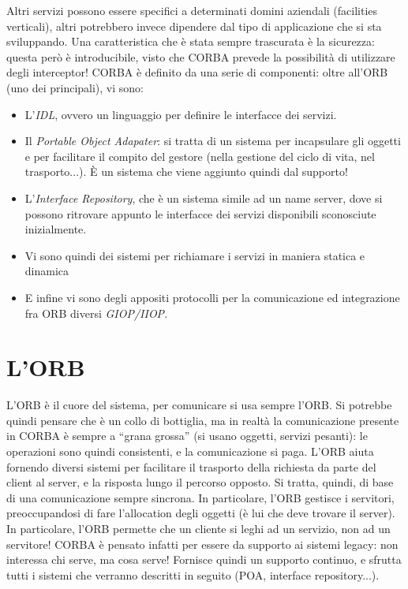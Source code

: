 Altri servizi possono essere specifici a determinati domini aziendali (facilities verticali), altri potrebbero invece dipendere dal tipo di
applicazione che si sta sviluppando.
Una caratteristica che è stata sempre trascurata è la sicurezza: questa però è introducibile, visto che CORBA prevede
la possibilità di utilizzare degli interceptor!
CORBA è definito da una serie di componenti: oltre all'ORB (uno dei principali), vi sono:
\begin{itemize}
 \item L'\textit{IDL}, ovvero un linguaggio per definire le interfacce dei servizi.
 \item Il \textit{Portable Object Adapater}: si tratta di un sistema per incapsulare gli oggetti e per facilitare il
compito del gestore (nella gestione del ciclo di vita, nel trasporto...). È un sistema che viene aggiunto quindi dal supporto!
 \item L'\textit{Interface Repository}, che è un sistema simile ad un name server, dove si possono ritrovare appunto le interfacce dei servizi disponibili sconosciute inizialmente.
 \item Vi sono quindi dei sistemi per richiamare i servizi in maniera statica e dinamica
 \item E infine vi sono degli appositi protocolli per la comunicazione ed integrazione fra ORB diversi \textit{GIOP/IIOP}.
\end{itemize}
\section{L'ORB}
L'ORB è il cuore del sistema, per comunicare si usa sempre l'ORB. Si potrebbe quindi pensare che è un collo di
bottiglia, ma in realtà la comunicazione presente in CORBA è sempre a ``grana grossa'' (si usano oggetti, servizi
pesanti): le operazioni sono quindi consistenti, e la comunicazione si paga. L'ORB aiuta fornendo diversi sistemi per
facilitare il trasporto della richiesta da parte del client al server, e la risposta lungo il percorso opposto. Si
tratta, quindi, di base di una comunicazione sempre sincrona.
In particolare, l'ORB gestisce i servitori, preoccupandosi di fare l'allocation degli oggetti (è lui che deve trovare il
server). In particolare, l'ORB permette che un cliente si leghi ad un servizio, non ad un servitore! CORBA è pensato
infatti per essere da supporto ai sistemi legacy: non interessa chi serve, ma cosa serve! Fornisce quindi un supporto
continuo, e sfrutta tutti i sistemi che verranno descritti in seguito (POA, interface repository...).
